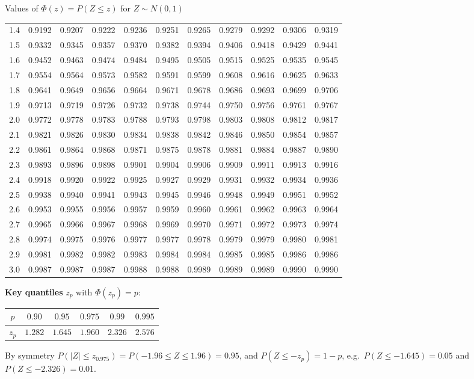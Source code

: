 \begin{key}{Values of $\Phi(z)=P(Z\le z)$ for $Z\sim N(0,1)$}
\begin{center}
\begin{tabular}{@{}c|cccccccccc@{}}
			1.4 & 0.9192 & 0.9207 & 0.9222 & 0.9236 & 0.9251 & 0.9265 & 0.9279 & 0.9292 & 0.9306 & 0.9319 \\
			1.5 & 0.9332 & 0.9345 & 0.9357 & 0.9370 & 0.9382 & 0.9394 & 0.9406 & 0.9418 & 0.9429 & 0.9441 \\
			1.6 & 0.9452 & 0.9463 & 0.9474 & 0.9484 & 0.9495 & 0.9505 & 0.9515 & 0.9525 & 0.9535 & 0.9545 \\
			1.7 & 0.9554 & 0.9564 & 0.9573 & 0.9582 & 0.9591 & 0.9599 & 0.9608 & 0.9616 & 0.9625 & 0.9633 \\
			1.8 & 0.9641 & 0.9649 & 0.9656 & 0.9664 & 0.9671 & 0.9678 & 0.9686 & 0.9693 & 0.9699 & 0.9706 \\
			1.9 & 0.9713 & 0.9719 & 0.9726 & 0.9732 & 0.9738 & 0.9744 & 0.9750 & 0.9756 & 0.9761 & 0.9767 \\
			2.0 & 0.9772 & 0.9778 & 0.9783 & 0.9788 & 0.9793 & 0.9798 & 0.9803 & 0.9808 & 0.9812 & 0.9817 \\
			2.1 & 0.9821 & 0.9826 & 0.9830 & 0.9834 & 0.9838 & 0.9842 & 0.9846 & 0.9850 & 0.9854 & 0.9857 \\
			2.2 & 0.9861 & 0.9864 & 0.9868 & 0.9871 & 0.9875 & 0.9878 & 0.9881 & 0.9884 & 0.9887 & 0.9890 \\
			2.3 & 0.9893 & 0.9896 & 0.9898 & 0.9901 & 0.9904 & 0.9906 & 0.9909 & 0.9911 & 0.9913 & 0.9916 \\
			2.4 & 0.9918 & 0.9920 & 0.9922 & 0.9925 & 0.9927 & 0.9929 & 0.9931 & 0.9932 & 0.9934 & 0.9936 \\
			2.5 & 0.9938 & 0.9940 & 0.9941 & 0.9943 & 0.9945 & 0.9946 & 0.9948 & 0.9949 & 0.9951 & 0.9952 \\
			2.6 & 0.9953 & 0.9955 & 0.9956 & 0.9957 & 0.9959 & 0.9960 & 0.9961 & 0.9962 & 0.9963 & 0.9964 \\
			2.7 & 0.9965 & 0.9966 & 0.9967 & 0.9968 & 0.9969 & 0.9970 & 0.9971 & 0.9972 & 0.9973 & 0.9974 \\
			2.8 & 0.9974 & 0.9975 & 0.9976 & 0.9977 & 0.9977 & 0.9978 & 0.9979 & 0.9979 & 0.9980 & 0.9981 \\
			2.9 & 0.9981 & 0.9982 & 0.9982 & 0.9983 & 0.9984 & 0.9984 & 0.9985 & 0.9985 & 0.9986 & 0.9986 \\
			3.0 & 0.9987 & 0.9987 & 0.9987 & 0.9988 & 0.9988 & 0.9989 & 0.9989 & 0.9989 & 0.9990 & 0.9990 \\
			\bottomrule
		\end{tabular}
	\end{center}
	\textbf{Key quantiles} $z_p$ with $\Phi(z_p)=p$:
	\begin{center}
		\begin{tabular}{@{}c|ccccc@{}}
			\toprule
			$p$   & $0.90$  & $0.95$  & $0.975$ & $0.99$  & $0.995$ \\\midrule
			$z_p$ & $1.282$ & $1.645$ & $1.960$ & $2.326$ & $2.576$ \\\bottomrule
		\end{tabular}
	\end{center}
	By symmetry $P(|Z|\le z_{0.975})=P(-1.96\le Z\le1.96)=0.95$, and
	$P(Z\le-z_p)=1-p$, e.g.\ $P(Z\le-1.645)=0.05$ and $P(Z\le-2.326)=0.01$.
\end{key}


